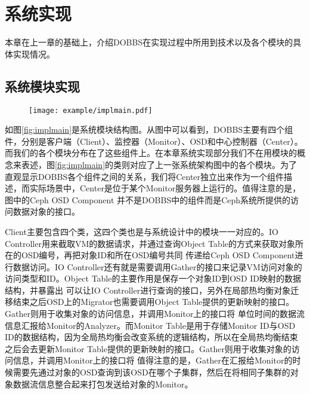 
\chapter{系统实现}
\label{chap:systemimpl}
本章在上一章的基础上，介绍DOBBS在实现过程中所用到技术以及各个模块的具体实现情况。

\section{系统模块实现}
\begin{figure}[!htp]
    \centering
    \texttt{[image: example/implmain.pdf]}
\end{figure}

如图\ref{fig:implmain}是系统模块结构图。从图中可以看到，DOBBS主要有四个组件，分别是客户端（Client）、监控器（Monitor）、OSD和中心控制器（Center）。
而我们的各个模块分布在了这些组件上。在本章系统实现部分我们不在用模块的概念来表述，图\ref{fig:implmain}的类则对应了上一张系统架构图中的各个模块。为了
直观显示DOBBS各个组件之间的关系，我们将Center独立出来作为一个组件描述，而实际场景中，Center是位于某个Monitor服务器上运行的。值得注意的是，图中的Ceph OSD Component
并不是DOBBS中的组件而是Ceph系统所提供的访问数据对象的接口。

Client主要包含四个类，这四个类也是与系统设计中的模块一一对应的。IO Controller用来截取VM的数据请求，并通过查询Object Table的方式来获取对象所在的OSD编号，再把对象ID和所在OSD编号共同
传递给Ceph OSD Component进行数据访问。IO Controller还有就是需要调用Gather的接口来记录VM访问对象的访问类型和ID。Object Table的主要作用是保存一个对象ID到OSD ID映射的数据结构，并暴露出
可以让IO Controller进行查询的接口，另外在局部热均衡对象迁移结束之后OSD上的Migrator也需要调用Object Table提供的更新映射的接口。Gather则用于收集对象的访问信息，并调用Monitor上的接口将
单位时间的数据流信息汇报给Monitor的Analyzer。而Monitor Table是用于存储Monitor ID与OSD ID的数据结构，因为全局热均衡会改变系统的逻辑结构，所以在全局热均衡结束之后会去更新Monitor Table提供的更新映射的接口。Gather则用于收集对象的访问信息，并调用Monitor上的接口将
值得注意的是，Gather在汇报给Monitor的时候需要先通过对象的OSD查询到该OSD在哪个子集群，然后在将相同子集群的对象数据流信息整合起来打包发送给对象的Monitor。

